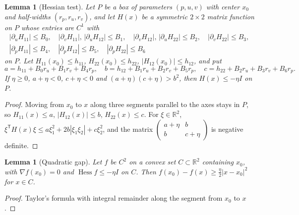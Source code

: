 \documentclass[11pt]{amsart}
\newtheorem{lemma}[theorem]{Lemma}
\theoremstyle{definition}
\theoremstyle{remark}
\numberwithin{equation}{section}
\newcommand{\R}{\mathbb{R}}
\newcommand{\Hess}{\operatorname{Hess}}
\begin{document}
\begin{lemma}[Hessian test]\label{lem:schur}
Let $P$ be a box of parameters $(p,u,v)$ with center $x_0$ and half-widths $(r_p,r_u,r_v)$, and let $H(x)$ be a symmetric $2\times2$ matrix function on $P$ whose entries are $C^1$ with
\[
\begin{gathered}
|\partial_uH_{11}|\le B_0,\quad |\partial_vH_{11}|,\,|\partial_uH_{12}|\le B_1,\quad |\partial_vH_{12}|,\,|\partial_uH_{22}|\le B_2,\quad |\partial_vH_{22}|\le B_3,\\
|\partial_pH_{11}|\le B_4,\quad |\partial_pH_{12}|\le B_5,\quad |\partial_pH_{22}|\le B_6
\end{gathered}
\]
on $P$. Let $H_{11}(x_0)\le h_{11}$, $H_{22}(x_0)\le h_{22}$, $|H_{12}(x_0)|\le h_{12}$, and put
\[
a=h_{11}+B_0r_u+B_1r_v+B_4r_p,\quad b=h_{12}+B_1r_u+B_2r_v+B_5r_p,\quad c=h_{22}+B_2r_u+B_3r_v+B_6r_p.
\]
If $\eta\ge0$, $a+\eta<0$, $c+\eta<0$ and $(a+\eta)(c+\eta)>b^2$, then $H(x)\le-\eta I$ on $P$.
\end{lemma}

\begin{proof}
Moving from $x_0$ to $x$ along three segments parallel to the axes stays in $P$, so $H_{11}(x)\le a$, $|H_{12}(x)|\le b$, $H_{22}(x)\le c$. For $\xi\in\R^2$, $\xi^{\mathsf T}H(x)\xi\le a\xi_1^2+2b|\xi_1\xi_2|+c\xi_2^2$, and the matrix $\begin{pmatrix}a+\eta&b\\b&c+\eta\end{pmatrix}$ is negative definite.
\end{proof}

\begin{lemma}[Quadratic gap]\label{lem:gap}
Let $f$ be $C^2$ on a convex set $C\subset\R^2$ containing $x_0$, with $\nabla f(x_0)=0$ and $\Hess f\le-\eta I$ on $C$. Then $f(x_0)-f(x)\ge\frac\eta2|x-x_0|^2$ for $x\in C$.
\end{lemma}

\begin{proof}
Taylor's formula with integral remainder along the segment from $x_0$ to $x$.
\end{proof}
\end{document}
